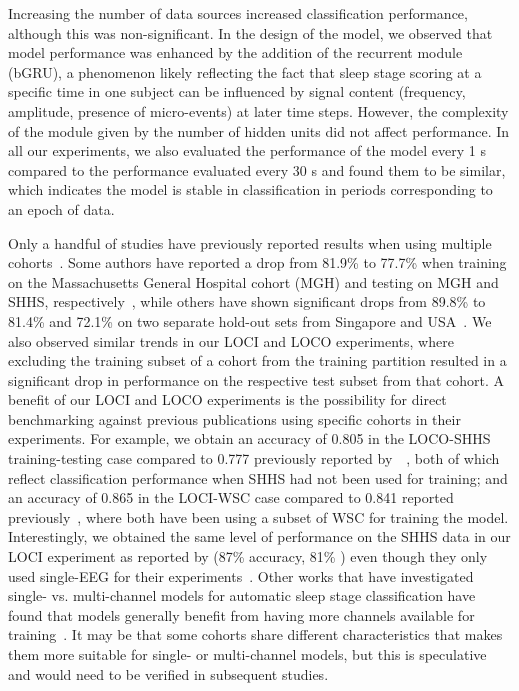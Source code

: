 Increasing the number of data sources increased classification performance, although this was non-significant.
In the design of the model, we observed that model performance was enhanced by the addition of the recurrent module (bGRU), a phenomenon likely reflecting the fact that sleep stage scoring at a specific time in one subject can be influenced by signal content (frequency, amplitude, presence of micro-events) at later time steps.
However, the complexity of the module given by the number of hidden units did not affect performance.
In all our experiments, we also evaluated the performance of the model every 1 s compared to the performance evaluated every 30 s and found them to be similar, which indicates the model is stable in classification in periods corresponding to an epoch of data.

Only a handful of studies have previously reported results when using multiple cohorts~\cite{Stephansen2018, Biswal2018, Patanaik2018}.
Some authors have reported a drop from 81.9\% to 77.7\% when training on the Massachusetts General Hospital cohort (MGH) and testing on MGH and \ac{SHHS}, respectively~\cite{Biswal2018}, while others have shown significant drops from 89.8\% to 81.4\% and 72.1\% on two separate hold-out sets from Singapore and USA~\cite{Patanaik2018}.
We also observed similar trends in our \ac{LOCI} and \ac{LOCO} experiments, where excluding the training subset of a cohort from the training partition resulted in a significant drop in performance on the respective test subset from that cohort.
A benefit of our \ac{LOCI} and \ac{LOCO} experiments is the possibility for direct benchmarking against previous publications using specific cohorts in their experiments.
For example, we obtain an accuracy of 0.805 in the \ac{LOCO}-\ac{SHHS} training-testing case compared to 0.777 previously reported by~\citeauthor{Biswal2018}~\cite{Biswal2018}, both of which reflect classification performance when \ac{SHHS} had not been used for training; and an accuracy of 0.865 in the \ac{LOCI}-\ac{WSC} case compared to 0.841 reported previously~\cite{Olesen2018c}, where both have been using a subset of \ac{WSC} for training the model. 
Interestingly, we obtained the same level of performance on the \ac{SHHS} data in our \ac{LOCI} experiment as reported by \citeauthor{Sors2018} (87\% accuracy, 81\% \cohen) even though they only used single-\ac{EEG} for their experiments~\cite{Sors2018}.
Other works that have investigated single- vs. multi-channel models for automatic sleep stage classification have found that models generally benefit from having more channels available for training~\cite{Chambon2018c, Biswal2018, Phan2019a}.
It may be that some cohorts share different characteristics that makes them more suitable for single- or multi-channel models, but this is speculative and would need to be verified in subsequent studies.

